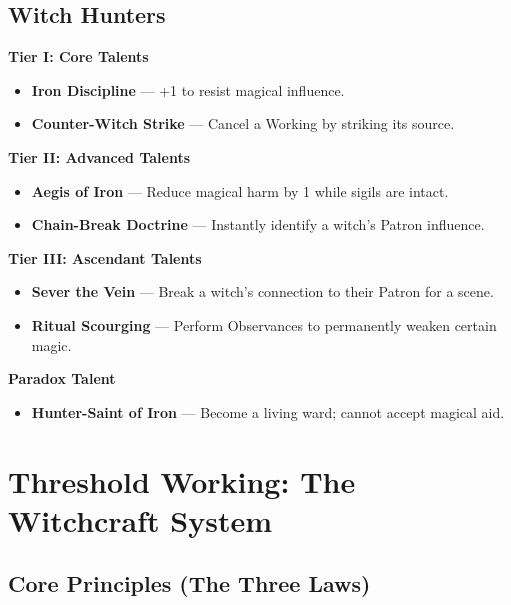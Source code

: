 \documentclass[11pt]{book}
\begin{document}
\subsection*{Witch Hunters}
\begin{tcolorbox}[colback=mistgray!10,colframe=shadowviolet,title={Witch Hunter Talents}]

\textbf{Tier I: Core Talents}
\begin{itemize}[noitemsep]
  \item \textbf{Iron Discipline} --- +1 to resist magical influence.
  \item \textbf{Counter-Witch Strike} --- Cancel a Working by striking its source.
\end{itemize}

\textbf{Tier II: Advanced Talents}
\begin{itemize}[noitemsep]
  \item \textbf{Aegis of Iron} --- Reduce magical harm by 1 while sigils are intact.
  \item \textbf{Chain-Break Doctrine} --- Instantly identify a witch's Patron influence.
\end{itemize}

\textbf{Tier III: Ascendant Talents}
\begin{itemize}[noitemsep]
  \item \textbf{Sever the Vein} --- Break a witch's connection to their Patron for a scene.
  \item \textbf{Ritual Scourging} --- Perform Observances to permanently weaken certain magic.
\end{itemize}

\textbf{Paradox Talent}
\begin{itemize}[noitemsep]
  \item \textbf{Hunter-Saint of Iron} --- Become a living ward; cannot accept magical aid.
\end{itemize}

\end{tcolorbox}

\section*{Threshold Working: The Witchcraft System}

\subsection*{Core Principles (The Three Laws)}
\end{document}
